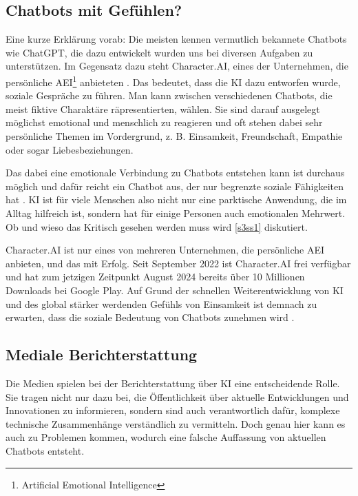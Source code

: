 	\subsection{Chatbots mit Gefühlen?}\label{s1ss1}
	Eine kurze Erklärung vorab: Die meisten kennen vermutlich bekannete Chatbots wie ChatGPT, die dazu
	entwickelt wurden uns bei diversen Aufgaben zu unterstützen. Im Gegensatz dazu steht Character.AI, 
	eines der Unternehmen, die \glqq{}persönliche\grqq{} AEI\footnote{Artificial Emotional Intelligence} 
	anbieteten \cite{cAI24}. Das bedeutet, dass die KI dazu entworfen wurde, soziale Gespräche zu führen.
	Man kann zwischen verschiedenen Chatbots, die meist fiktive Charaktäre räpresentierten, wählen. Sie
	sind darauf ausgelegt möglichst emotional und menschlich zu reagieren und oft stehen dabei sehr 
	persönliche Themen im Vordergrund, z. B. Einsamkeit, Freundschaft, Empathie oder sogar Liebesbeziehungen. 
	
	Das dabei eine emotionale Verbindung zu Chatbots entstehen kann ist durchaus möglich und dafür reicht ein 
	Chatbot aus, der nur begrenzte soziale Fähigkeiten hat \cite{chen24}. KI ist für viele Menschen also 
	nicht nur eine parktische Anwendung, die im Alltag hilfreich ist, sondern hat für einige Personen auch
	emotionalen Mehrwert. Ob und wieso das Kritisch gesehen werden muss wird \ref{s3ss1} diskutiert.  

	Character.AI ist nur eines von mehreren Unternehmen, die persönliche AEI anbieten, und das mit Erfolg. 
	Seit September 2022 ist Character.AI frei verfügbar und hat zum jetzigen Zeitpunkt August 2024 bereits
	über 10 Millionen Downloads bei Google Play. Auf Grund der schnellen Weiterentwicklung von KI und des 
	global stärker werdenden Gefühls von Einsamkeit ist demnach zu erwarten, dass die soziale Bedeutung 
	von Chatbots zunehmen wird \cite{chen24}. 
	
	
	\clearpage		
	\subsection{Mediale Berichterstattung}\label{s1ss2}
	Die Medien spielen bei der Berichterstattung über KI eine entscheidende Rolle. Sie tragen nicht nur dazu
	bei, die Öffentlichkeit über aktuelle Entwicklungen und Innovationen zu informieren, sondern sind auch 
	verantwortlich dafür, komplexe technische Zusammenhänge verständlich zu vermitteln. Doch genau hier kann
	es auch zu Problemen kommen, wodurch eine falsche Auffassung von aktuellen Chatbots entsteht.

